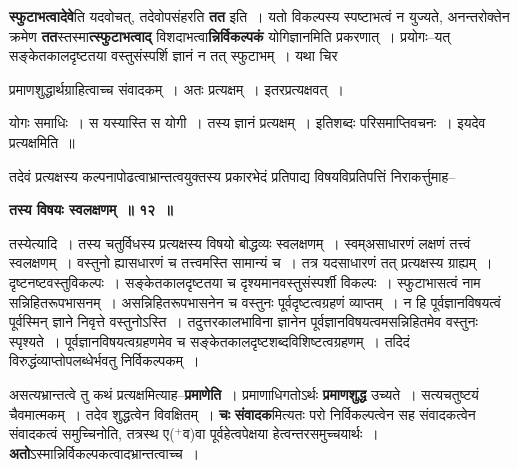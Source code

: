 \documentclass[article,12pt,a4paper]{memoir}
\newcommand{\add}[1]{($^{+}$#1)}
\begin{document}
	  \pstart \textbf{स्फुटाभत्वादेवे}ति यदवोचत्, तदेवोपसंहरति \textbf{तत} इति । यतो विकल्पस्य स्पष्टाभत्वं न युज्यते, अनन्तरोक्तेन क्रमेण \textbf{तत}स्तस्मा\textbf{त्स्फुटाभत्वाद्} विशदाभत्वा\textbf{न्निर्विकल्पकं} योगिज्ञानमिति प्रकरणात् । प्रयोगः--यत् सङ्केतकालदृष्टतया वस्तुसंस्पर्शि ज्ञानं न तत् स्फुटाभम् । यथा चिर \leavevmode{} 
	  
	प्रमाणशुद्धार्थग्राहित्वाच्च संवादकम् । अतः प्रत्यक्षम् । इतरप्रत्यक्षवत् ।  
	  
	योगः समाधिः । स यस्यास्ति स योगी । तस्य ज्ञानं प्रत्यक्षम् । इतिशब्दः परिसमाप्तिवचनः । इयदेव प्रत्यक्षमिति ॥  
	  
	तदेवं प्रत्यक्षस्य कल्पनापोढत्वाभ्रान्तत्वयुक्तस्य प्रकारभेदं प्रतिपाद्य विषयविप्रतिपत्तिं निराकर्त्तुमाह--  
	  
	\textbf{तस्य विषयः स्वलक्षणम् ॥ १२ ॥} 
	  
	तस्येत्यादि । तस्य चतुर्विधस्य प्रत्यक्षस्य विषयो बोद्धव्यः स्वलक्षणम् । स्वम्असाधारणं लक्षणं तत्त्वं स्वलक्षणम् । वस्तुनो ह्यासधारणं च तत्त्वमस्ति सामान्यं च । तत्र यदसाधारणं तत् प्रत्यक्षस्य ग्राह्यम् । दृष्टनष्टवस्तुविकल्पः । सङ्केतकालदृष्टतया च दृश्यमानवस्तुसंस्पर्शी विकल्पः । स्फुटाभासत्वं नाम सन्निहितरूपभासनम् । असन्निहितरूपभासनेन च वस्तुनः पूर्वदृष्टत्वग्रहणं व्याप्तम् । न हि पूर्वज्ञानविषयत्वं पूर्वस्मिन् ज्ञाने निवृत्ते वस्तुनोऽस्ति । तदुत्तरकालभाविना ज्ञानेन पूर्वज्ञानविषयत्वमसन्निहितमेव वस्तुनः स्पृश्यते । पूर्वज्ञानविषयत्वग्रहणमेव च सङ्केतकालदृष्टशब्दविशिष्टत्वग्रहणम् । तदिदं विरुद्धंव्याप्तोपलब्धेर्भवतु निर्विकल्पकम् ।
	\pend
      

	  \pstart असत्यभ्रान्तत्वे तु कथं प्रत्यक्षमित्याह--\textbf{प्रमाणेति} । प्रमाणाधिगतोऽर्थः \textbf{प्रमाणशुद्ध} उच्यते । सत्यचतुष्टयं चैवमात्मकम् । तदेव शुद्धत्वेन विवक्षितम् । \textbf{चः} \leavevmode{} \textbf{संवादक}मित्यतः परो निर्विकल्पत्वेन सह संवादकत्वेन संवादकत्वं समुच्चिनोति, तत्रस्थ ए\add{व}वा पूर्वहेत्वपेक्षया हेत्वन्तरसमुच्चयार्थः । \textbf{अतो}ऽस्मान्निर्विकल्पकत्वादभ्रान्तत्वाच्च ।
	\pend
      
\end{document}
